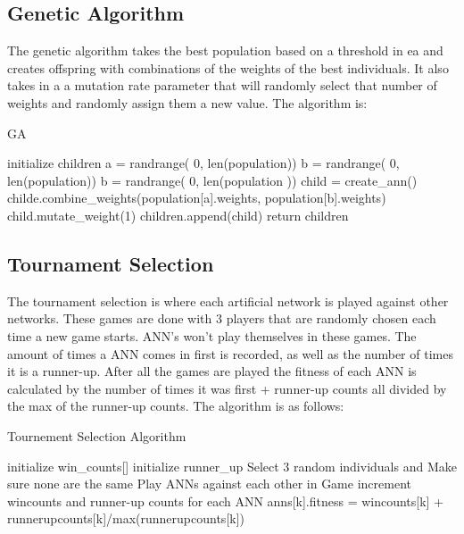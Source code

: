 \subsection{Genetic Algorithm}
The genetic algorithm takes the best population based on a threshold in ea and creates offspring with combinations of the weights of the best individuals. It also takes in a a mutation rate parameter that will randomly select that number of weights and randomly assign them a new value. The algorithm is:
\begin{algorithm} [tbh]                     %
\caption{GA}          %
\label{GA}                           %
\begin{algorithmic}                    %
    \STATE initialize children
    	\STATE a = randrange( 0, len(population)) 
    	\STATE b = randrange( 0, len(population))
    		\STATE b = randrange( 0, len(population )) 
    	\ENDWHILE
    	\STATE child = create\_ann()
    	\STATE childe.combine\_weights(population[a].weights, population[b].weights)
    		\STATE child.mutate\_weight(1)
    	\ENDIF
    	\STATE children.append(child)
    \ENDFOR
    \STATE return children
\end{algorithmic}
\end{algorithm}
\subsection{Tournament Selection}
The tournament selection is where each artificial network is played against other networks. These games are done with 3 players that are randomly chosen each time a new game starts. ANN's won't play themselves in these games. The amount of times a ANN comes in first is recorded, as well as the number of times it is a runner-up. After all the games are played the fitness of each ANN is calculated by the number of times it was first + runner-up counts all divided by the max of the runner-up counts. The algorithm is as follows:
\begin{algorithm} [tbh]                     %
\caption{Tournement Selection Algorithm}          %
\label{Tourny}                           %
\begin{algorithmic}                    %
    \STATE initialize win\_counts[]
    \STATE initialize runner\_up
    	\STATE Select 3 random individuals and Make sure none are the same
    	\STATE Play ANNs against each other in Game
    	\STATE increment wincounts and runner-up counts for each ANN    	
    \ENDFOR
    	\STATE anns[k].fitness = wincounts[k] + runnerupcounts[k]/max(runnerupcounts[k])
    \ENDFOR
\end{algorithmic}
\end{algorithm}